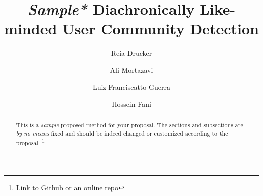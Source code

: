 \documentclass[sigconf]{acmart}
\begin{document}
\title{\textit{Sample*} Diachronically Like-minded User Community Detection}
\author{Reia Drucker}
\author{Ali Mortazavi}
\author{Luiz Franciscatto Guerra}

\author{Hossein Fani}

\begin{abstract}
{\color{blue}This is a \textit{sample} proposed method for your proposal. The sections and subsections are \textit{by no means} fixed and should be indeed changed or customized according to the proposal. \footnote{Link to Github or an online repo}}
\end{abstract}

\maketitle
\end{document}
